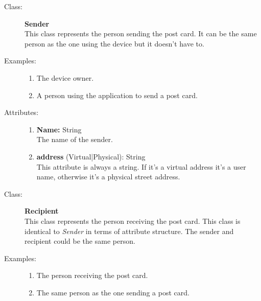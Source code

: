 \documentclass[10pt,a4paper]{article}
\begin{document}
\hrulefill

\begin{description}
\item[Class:] \textbf{Sender} \hfill \\
This class represents the person sending the post card. It can be the same person as the one using the device but it doesn't have to.

\item[Examples:] \hfill
\begin{enumerate}
\item The device owner.
\item A person using the application to send a post card.
\end{enumerate}

\item[Attributes:] \hfill
\begin{enumerate}
\item \textbf{Name:} String \hfill \\The name of the sender. 
\item \textbf{address} (Virtual|Physical): String \hfill \\This attribute is always a string. If it's a virtual address it's a user name, otherwise it's a physical street address. 
\end{enumerate}
\end{description}

\hrulefill

\begin{description}
\item[Class:] \textbf{Recipient} \hfill \\
This class represents the person receiving the post card. This class is identical to \textit{Sender} in terms of attribute structure. The sender and recipient could be the same person.

\item[Examples:] \hfill
\begin{enumerate}
\item The person receiving the post card.
\item The same person as the one sending a post card.
\end{enumerate}
\end{description}

\hrulefill
\end{document}
